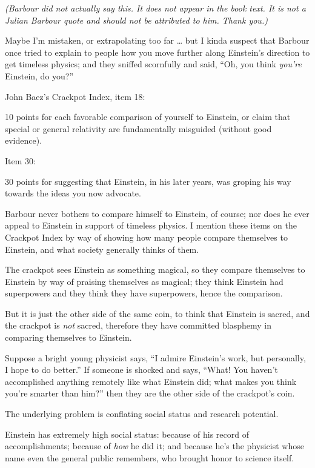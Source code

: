 {
 \textit{(Barbour did not actually say this. It does not appear in
the book text. It is not a Julian Barbour quote and should not be
attributed to him. Thank you.)}}

{
 Maybe I'm mistaken, or extrapolating too far \ldots
but I kinda suspect that Barbour once tried to explain to people how
you move further along Einstein's direction to get
timeless physics; and they sniffed scornfully and said,
``Oh, you think \textit{you're}
Einstein, do you?''}

{
 John Baez's Crackpot Index, item 18:}

{
 10 points for each favorable comparison of yourself to Einstein,
or claim that special or general relativity are fundamentally misguided
(without good evidence).}

{
 Item 30:}

{
 30 points for suggesting that Einstein, in his later years, was
groping his way towards the ideas you now advocate.}

{
 Barbour never bothers to compare himself to Einstein, of course;
nor does he ever appeal to Einstein in support of timeless physics. I
mention these items on the Crackpot Index by way of showing how many
people compare themselves to Einstein, and what society generally
thinks of them.}

{
 The crackpot sees Einstein as something magical, so they compare
themselves to Einstein by way of praising themselves as magical; they
think Einstein had superpowers and they think they have superpowers,
hence the comparison.}

{
 But it is just the other side of the same coin, to think that
Einstein is sacred, and the crackpot is \textit{not} sacred, therefore
they have committed blasphemy in comparing themselves to Einstein.}

{
 Suppose a bright young physicist says, ``I admire
Einstein's work, but personally, I hope to do
better.'' If someone is shocked and says,
``What! You haven't accomplished
anything remotely like what Einstein did; what makes you think
you're smarter than him?'' then they
are the other side of the crackpot's coin.}

{
 The underlying problem is conflating social status and research
potential.}

{
 Einstein has extremely high social status: because of his record
of accomplishments; because of \textit{how} he did it; and because
he's the physicist whose name even the general public
remembers, who brought honor to science itself.}

